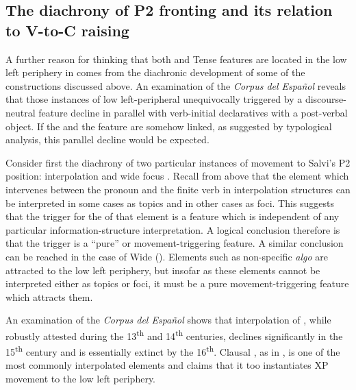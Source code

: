 \documentclass[output=paper]{LSP/langsci}
\begin{document}
\subsection{The diachrony of P2 fronting and its relation to V-to-C raising}\label{sec:poole:3.4}
A further reason for thinking that both  and Tense features are located in the low left periphery in  comes from the diachronic development of some of the constructions discussed above.  An examination of the \textit{Corpus del Español} reveals that those instances of low left-peripheral  unequivocally triggered by a discourse-neutral  feature decline in parallel with verb-initial declaratives with a post-verbal object.  If the  and the  feature are somehow linked, as suggested by  typological analysis, this parallel decline would be expected.

Consider first the diachrony of two particular instances of movement to Salvi’s P2 position:  interpolation and wide focus .  Recall from  above that the element which intervenes between the  pronoun and the finite verb in interpolation structures can be interpreted in some cases as topics and in other cases as foci.  This suggests that the trigger for the  of that element is a feature which is independent of any particular information-structure interpretation.  A logical conclusion therefore is that the trigger is a ``pure''  or movement-triggering feature.  A similar conclusion can be reached in the case of  Wide   ().  Elements such as non-specific \textit{algo} are attracted to the low left periphery, but insofar as these elements cannot be interpreted either as topics or foci, it must be a pure movement-triggering feature which attracts them.  

An examination of the \textit{Corpus del Español} shows that interpolation of , while robustly attested during the 13\textsuperscript{th} and 14\textsuperscript{th} centuries, declines significantly in the 15\textsuperscript{th} century and is essentially extinct by the 16\textsuperscript{th}.  Clausal , as in , is one of the most commonly interpolated elements and \citet{Poole2013} claims that it too instantiates XP movement to the low left periphery.
\end{document}
